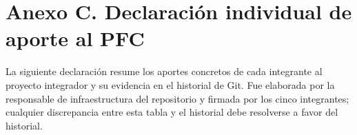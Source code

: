 \section*{Anexo C. Declaraci\'on individual de aporte al PFC}

La siguiente declaraci\'on resume los aportes concretos de cada integrante al proyecto integrador y su evidencia en el historial de Git. Fue elaborada por la responsable de infraestructura del repositorio y firmada por los cinco integrantes; cualquier discrepancia entre esta tabla y el historial debe resolverse a favor del historial.

